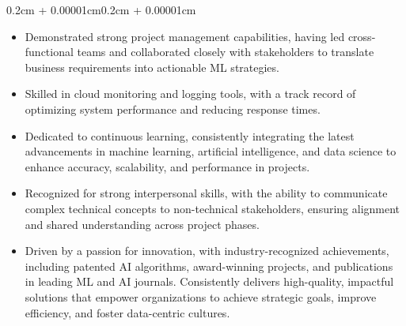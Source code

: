 \documentclass{article}
\newenvironment{highlights}{
    \begin{itemize}[
        topsep=0.10cm, 
        parsep=0.08cm, 
        partopsep=0pt, 
        itemsep=0.08cm, 
        leftmargin=0.4cm + 10pt
    ]
}{
    \end{itemize}
}
\newenvironment{onecolentry}{
    \begin{adjustwidth}{0.2cm + 0.00001cm}{0.2cm + 0.00001cm}
}{
    \end{adjustwidth}
}
\begin{document}
\begin{onecolentry}
\begin{highlights}
        \item Demonstrated strong project management capabilities, having led cross-functional teams and collaborated closely with stakeholders to translate business requirements into actionable ML strategies.
        \item Skilled in cloud monitoring and logging tools, with a track record of optimizing system performance and reducing response times.
        \item Dedicated to continuous learning, consistently integrating the latest advancements in machine learning, artificial intelligence, and data science to enhance accuracy, scalability, and performance in projects.
        \item Recognized for strong interpersonal skills, with the ability to communicate complex technical concepts to non-technical stakeholders, ensuring alignment and shared understanding across project phases.
        \item Driven by a passion for innovation, with industry-recognized achievements, including patented AI algorithms, award-winning projects, and publications in leading ML and AI journals. Consistently delivers high-quality, impactful solutions that empower organizations to achieve strategic goals, improve efficiency, and foster data-centric cultures.
    \end{highlights}
\end{onecolentry}
\end{document}
